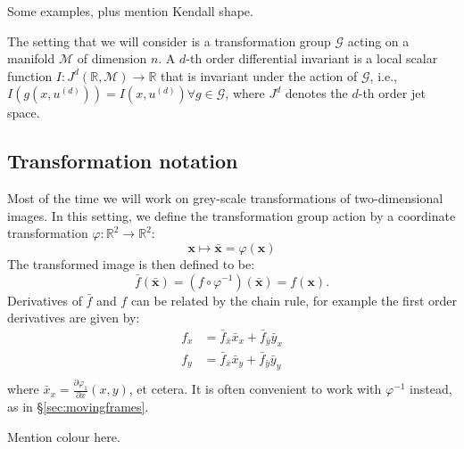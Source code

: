 \documentclass[review,onefignum,onetabnum]{siamonline190516}
\begin{document}
Some examples, plus mention Kendall shape. 

The setting that we will consider is a transformation group $\mathcal{G}$
acting on a manifold $\mathcal{M}$ of dimension $n$. A $d$-th order
differential invariant is a local scalar function $I: J^{d} (\mathbb{R},
\mathcal{M} ) \to \mathbb{R}$ that is invariant under the action of
$\mathcal{G}$, i.e., $I(g(x,u^{(d)})) = I(x, u^{(d)}) \forall g \in
\mathcal{G}$, where $J^{d}$ denotes the $d$-th order jet space.

\subsection{Transformation notation}
Most of the time we will work on grey-scale transformations of two-dimensional images. In this setting, we define the transformation group action by a coordinate transformation $\varphi \colon \mathbb{R}^2 \to \mathbb{R}^2$:
\begin{equation}\label{eq:transformation}
  \mathbf{x} \mapsto \bar{\mathbf{x}} = \varphi(\mathbf{x})
\end{equation}
The transformed image is then defined to be:
\begin{equation}\label{eq:fbarequalsf}
  \bar{f}(\bar{\mathbf{x}}) = (f\circ\varphi^{-1})(\bar{\mathbf{x}}) = f(\mathbf{x}).
\end{equation}
Derivatives of $\bar{f}$ and $f$ can be related by the chain rule, for example the first order derivatives are given by:
\begin{equation}\label{eq:prolongation}
  \begin{aligned}
    f_x &= \bar{f}_{\bar{x}} \bar{x}_x + \bar{f}_{\bar{y}}\bar{y}_x \\
    f_y &= \bar{f}_{\bar{x}} \bar{x}_y + \bar{f}_{\bar{y}}\bar{y}_y \\
  \end{aligned}
\end{equation}
where $\bar{x}_x = \frac{\partial \varphi_1}{\partial x}(x, y)$, et cetera. It is often convenient to work with $\varphi^{-1}$ instead, as in \S\ref{sec:movingframes}.

Mention colour here.
\end{document}
